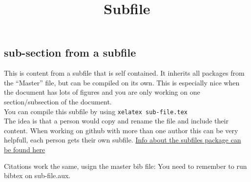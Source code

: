 \documentclass[example.tex]{subfiles}
\title{Subfile}
\begin{document}
\onlyinsubfile{
  \maketitle
  \thispagestyle{empty}
  \tableofcontents
}


\subsection{sub-section from a subfile}

This is content from a subfile that is self contained. 
It inherits all packages from the ``Master'' file, but can be compiled
on its own.  This is especially nice when the document has lots of
figures and you are only working on one section/subsection of the
document. \\


You can compile this subfile by using 
\verb+xelatex sub-file.tex+\\


The idea is that a person would copy and rename the file
and include their content.  When working on github with more than
one author this can be very helpfull, each person gets their own
subfile.  %
\href{https://en.wikibooks.org/wiki/LaTeX/Modular_Documents#Subfiles}{Info
  about the subfiles package can be found here}


Citations work the same, usign the master bib file: 
You need to remember to run bibtex on sub-file.aux.  \cite{ndmg}

\end{document}
